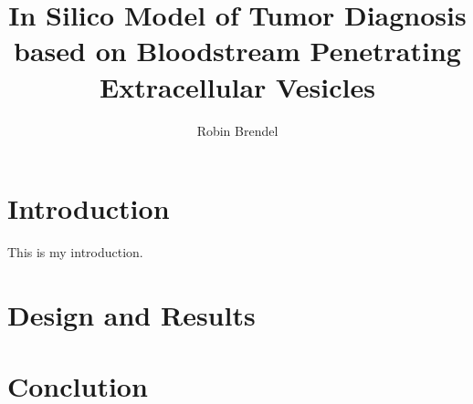 \documentclass[sigconf]{acmart}
\begin{document}
\title{In Silico Model of Tumor Diagnosis based on Bloodstream Penetrating Extracellular Vesicles}
\author{Robin Brendel}

\begin{abstract}

\end{abstract}


\maketitle

\section{Introduction}
\label{sec: introduction}
This is my introduction.

\section{Design and Results}
\label{sec: design-results}

\section{Conclution}
\label{sec: conclution}



\end{document}
